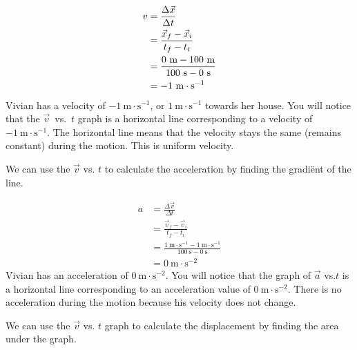     \begin{align*}
    v &= \frac{\Delta \vec{x}}{\Delta t}\hfill \\ 
      &= \frac{\vec{x}_{f}-\vec{x}_{i}}{{t}_{f}-{t}_{i}}\\ 
      &= \frac{0~\text{m}-100~\text{m}}{100~\text{s}-0~\text{s}}\hfill \\ 
      &= -1~\text{m}\ensuremath{\cdot}{\text{s}}^{-1}
      \end{align*}
Vivian has a velocity of $-1~\text{m}\ensuremath{\cdot}\text{s}{}^{-1}$, or $1~\text{m}\ensuremath{\cdot}\text{s}{}^{-1}$ towards her house. You will notice that the $\vec{v}$~vs.~$t$ graph is a horizontal line corresponding to a velocity of $-1~\text{m}\ensuremath{\cdot}\text{s}{}^{-1}$. The horizontal line means that the velocity stays the same (remains constant) during the motion. This is uniform velocity.\par 
        \label{m38795*id70573}We can use the $\vec{v}$ vs. $t$ to calculate the acceleration by finding the gradi\"ent of the line.\par 
        \label{m38795*id70595}\nopagebreak\noindent{}
          
    \begin{align*}
      a&= \frac{\Delta \vec{v}}{\Delta t}\\ 
      &= \frac{\vec{v}_{f}-\vec{v}_{i}}{{t}_{f}-{t}_{i}}\\ 
      &= \frac{1~\text{m}\ensuremath{\cdot}{\text{s}}^{-1}-1~\text{m}\ensuremath{\cdot}{\text{s}}^{-1}}{100~\text{s}-0~\text{s}}\\ 
      &= 0~\text{m}\ensuremath{\cdot}{\text{s}}^{-2}
      \end{align*}
        \label{m38795*id70807}Vivian has an acceleration of $0~\text{m}\ensuremath{\cdot}\text{s}{}^{-2}$. You will notice that the graph of $\vec{a}$ vs.$t$ is a horizontal line corresponding to an acceleration value of $0~\text{m}\ensuremath{\cdot}\text{s}{}^{-2}$. There is no acceleration during the motion because his velocity does not change.\par 
        \label{m38795*id70880}We can use the $\vec{v}$ vs. $t$ graph to calculate the displacement by finding the area under the graph.\par 
        \label{m38795*id70902}\nopagebreak\noindent{}
          
